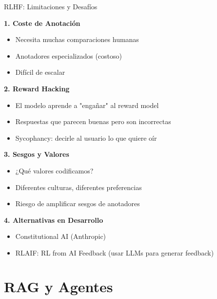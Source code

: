 \begin{frame}{RLHF: Limitaciones y Desafíos}

\textbf{1. Coste de Anotación}
\begin{itemize}
    \item Necesita muchas comparaciones humanas
    \item Anotadores especializados (costoso)
    \item Difícil de escalar
\end{itemize}

\vspace{0.5em}

\textbf{2. Reward Hacking}
\begin{itemize}
    \item El modelo aprende a "engañar" al reward model
    \item Respuestas que parecen buenas pero son incorrectas
    \item Sycophancy: decirle al usuario lo que quiere oír
\end{itemize}

\vspace{0.5em}

\textbf{3. Sesgos y Valores}
\begin{itemize}
    \item ¿Qué valores codificamos?
    \item Diferentes culturas, diferentes preferencias
    \item Riesgo de amplificar sesgos de anotadores
\end{itemize}

\vspace{0.5em}

\textbf{4. Alternativas en Desarrollo}
\begin{itemize}
    \item Constitutional AI (Anthropic)
    \item RLAIF: RL from AI Feedback (usar LLMs para generar feedback)
\end{itemize}

\end{frame}

\section{RAG y Agentes}

